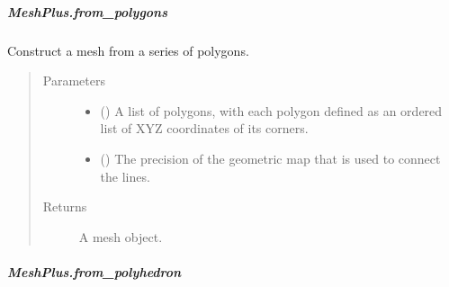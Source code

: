 \documentclass[letterpaper,10pt,english]{sphinxmanual}
\begin{document}
\begin{fulllineitems}
\subparagraph{MeshPlus.from\_polygons}
\label{\detokenize{api/generated/directional_clustering.mesh.MeshPlus.from_polygons:meshplus-from-polygons}}\label{\detokenize{api/generated/directional_clustering.mesh.MeshPlus.from_polygons::doc}}

\begin{fulllineitems}
\label{\detokenize{api/generated/directional_clustering.mesh.MeshPlus.from_polygons:directional_clustering.mesh.MeshPlus.from_polygons}}
Construct a mesh from a series of polygons.
\begin{quote}\begin{description}
\item[{Parameters}] \leavevmode\begin{itemize}
\item {} 
 () \textendash{} A list of polygons, with each polygon defined as an ordered list of
XYZ coordinates of its corners.

\item {} 
 () \textendash{} The precision of the geometric map that is used to connect the lines.

\end{itemize}

\item[{Returns}] \leavevmode
{} \textendash{} A mesh object.

\end{description}\end{quote}

\end{fulllineitems}



\subparagraph{MeshPlus.from\_polyhedron}
\label{\detokenize{api/generated/directional_clustering.mesh.MeshPlus.from_polyhedron:meshplus-from-polyhedron}}\label{\detokenize{api/generated/directional_clustering.mesh.MeshPlus.from_polyhedron::doc}}


\end{fulllineitems}
\end{document}
